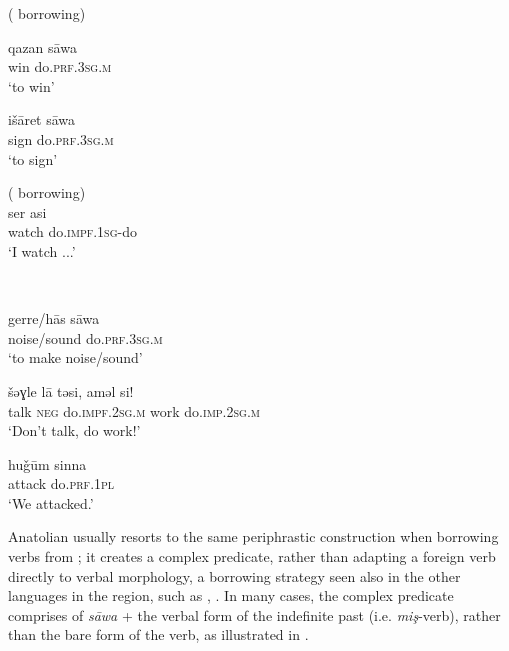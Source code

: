 \documentclass[output=paper]{langsci/langscibook}
\begin{document}
\begin{exe}
\ex \label{l}   ( borrowing)
		\begin{xlist}
			\ex \label{ltk2} \gll qazan 	s\={a}wa  \\
        win	do.\textsc{prf.3sg.m}\\
        \glt `to win'

		\ex \label{ltk1}\gll išāret s\={a}wa \\
    sign  do.\textsc{prf.3sg.m}\\
        \glt `to sign'



		\end{xlist}

      \ex \label{l3}   ( borrowing) \\
      \gll ser asi \\
        watch do.\textsc{impf.1sg}-do\\
        \glt `I watch ...'

        \ex \label{lar}   \\
		\begin{xlist}
		\ex \gll gerre/h\={a}s s\={a}wa\\
    noise/sound do.\textsc{prf.3sg.m}\\
        \glt `to make noise/sound'


	\ex \label{lar2} \gll šəɣle l\={a} təsi, aməl si!  \\
      talk \textsc{neg} do.\textsc{impf.2sg.m} work do.\textsc{imp.2sg.m}\\
        \glt `Don't talk, do work!'

        \ex \label{lar3}\gll hu\v{g}ūm sinna \\
    attack  do.\textsc{prf.1pl}\\
        \glt `We attacked.'
		\end{xlist}

\end{exe}

\noindent Anatolian  usually resorts to the same periphrastic construction when borrowing verbs from ; it creates a complex predicate, rather than adapting a foreign verb directly to  verbal morphology, a borrowing strategy seen also in the other languages in the region, such as , . In many cases, the complex predicate comprises of \textit{s\={a}wa} + the  verbal form of the indefinite past (i.e. \textit{mi\c{s}}-verb), rather than the bare form of the verb, as illustrated in .
\end{document}
